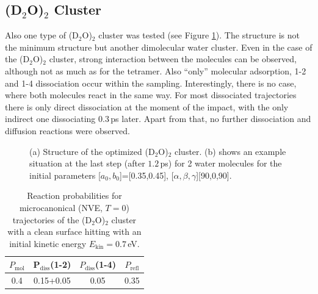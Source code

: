 \documentclass[11pt,DIV=13,BCOR=5mm,a4paper,headinclude]{scrbook}
\begin{document}
\subsection{(D$_2$O)$_2$ Cluster}
Also one type of (D$_2$O)$_2$ cluster was tested (see Figure \ref{abb:D2O2clusters}).
The structure is not the minimum structure but another dimolecular water cluster.
Even in the case of the (D$_2$O)$_2$ cluster, strong interaction between the molecules can be observed, although not as much as for the tetramer.
Also ``only'' molecular adsorption, 1-2 and 1-4 dissociation occur within the sampling.
Interestingly, there is no case, where both molecules react in the same way.
For most dissociated trajectories there is only direct dissociation at the moment of the impact, with the only indirect one dissociating $0.3\,$ps later.
Apart from that, no further dissociation and diffusion reactions were observed.
\begin{figure}[!t]
\centering
{}
         \quad
{}
          \quad
\caption{(a) Structure of the optimized (D$_2$O)$_2$ cluster.
(b) shows an example situation at the last step (after $1.2\,$ps) for 2 water molecules for the initial parameters [$a_0,b_0$]=[0.35,0.45], [$\alpha,\beta,\gamma$][90,0,90].}
       \label{abb:D2O2clusters}
\end{figure}

\begin{table}[!h]
 \centering
  \caption{Reaction probabilities for microcanonical (NVE, $T=0$) 
 trajectories of the (D$_2$O)$_2$ cluster with a clean surface 
 hitting with an initial kinetic energy $E_\textrm{kin}=0.7\,$eV.}
 \begin{tabular}{cccc}
\toprule
$P_\textrm{mol}$ & P$_\textrm{diss}$(1-2) &  $P_\textrm{diss}$(1-4) & $P_\textrm{refl}$ \\\midrule
0.4&0.15+0.05 & 0.05&0.35\\\bottomrule
\end{tabular}
 \label{tab:2D2O-prob}
\end{table}
\end{document}

